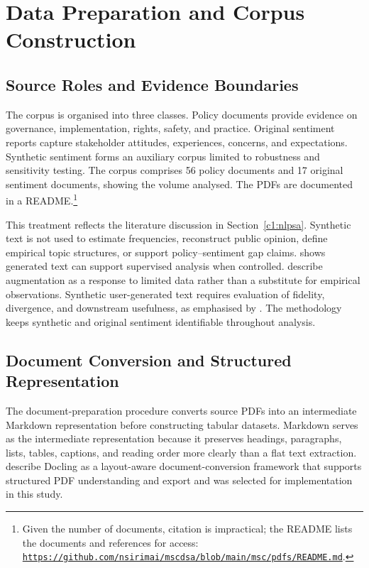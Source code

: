 \section{Data Preparation and Corpus Construction}
\label{sec:method-data-preparation}

\subsection{Source Roles and Evidence Boundaries}
\label{subsec:method-source-roles}

The corpus is organised into three classes. Policy documents provide evidence on
governance, implementation, rights, safety, and practice. Original sentiment reports
capture stakeholder attitudes, experiences, concerns, and expectations. Synthetic
sentiment forms an auxiliary corpus limited to robustness and sensitivity testing.
The corpus comprises 56 policy documents and 17 original sentiment documents, showing
the volume analysed. The PDFs are documented in a README.\footnote{Given the number
of documents, citation is impractical; the README lists the documents and references
for access:
\href{https://github.com/nsirimai/mscdsa/blob/main/msc/pdfs/README.md}
{\texttt{https://github.com/nsirimai/mscdsa/blob/main/msc/pdfs/README.md}}.}


This treatment reflects the literature discussion in Section~\ref{c1:nlpsa}.
Synthetic text is not used to estimate frequencies, reconstruct public opinion,
define empirical topic structures, or support policy--sentiment gap claims.
\cite{halterman2025synthetic} shows generated text can support supervised analysis
when controlled. \cite{chen2023empirical} describe augmentation as a response to
limited data rather than a substitute for empirical observations. Synthetic
user-generated text requires evaluation of fidelity, divergence, and downstream
usefulness, as emphasised by \cite{chim2025evaluating}. The methodology keeps
synthetic and original sentiment identifiable throughout analysis.

\subsection{Document Conversion and Structured Representation}
\label{subsec:method-document-conversion}

The document-preparation procedure converts source PDFs into an intermediate Markdown
representation before constructing tabular datasets. Markdown serves as the
intermediate representation because it preserves headings, paragraphs, lists, tables,
captions, and reading order more clearly than a flat text extraction.
\cite{auer2024docling} describe Docling as a layout-aware document-conversion
framework that supports structured PDF understanding and export and was selected for
implementation in this study.


